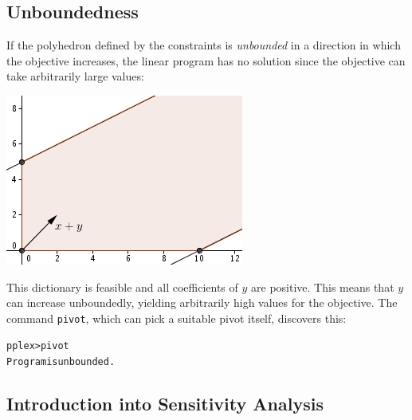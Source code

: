 \documentclass[ukenglish]{nik}
\begin{document}
\subsection{Unboundedness}\label{sec:unbounded}
If the polyhedron defined by the constraints is 
\emph{unbounded} in a direction in which the objective increases, the linear program has no solution
since the objective can take arbitrarily large values:

\vspace{.2cm}
\begin{minipage}{.55\textwidth}
\begin{alltt}

\end{alltt}
\end{minipage}
\begin{minipage}{.45\textwidth}
	\includegraphics{ex_unbound.jpg}
\end{minipage}
This dictionary is feasible and all coefficients of $y$ are positive. 
This means that $y$ can increase unboundedly, 
yielding arbitrarily high values for the objective.
The command \verb|pivot|, which can pick a suitable pivot itself,
discovers this:
\begin{alltt}
pplex> pivot
Program is unbounded.
\end{alltt}

\subsection{Introduction into Sensitivity Analysis}
\end{document}
